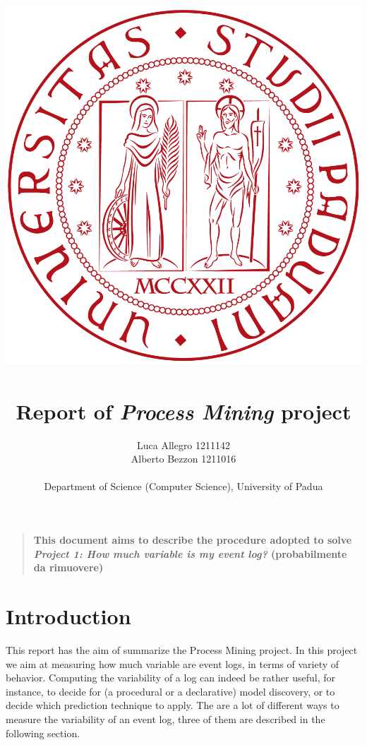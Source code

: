 \documentclass[12pt]{article}
\title{
		\includegraphics[scale=0.20]{logo-unipd}~ 
		\\[2cm]
		Report of {\it Process Mining\/} project
	}
\author
{Luca Allegro 1211142 \\ Alberto Bezzon 1211016\\
\\
Department of Science (Computer Science), University of Padua
}
\date{}
\newenvironment{sciabstract}{%
\begin{quote} \bf}
{\end{quote}}
\begin{document}
 


\baselineskip18pt


\maketitle 




\begin{sciabstract}
  This document aims to describe the procedure adopted to solve \textit{Project 1: How much variable is my event log?}
  (probabilmente da rimuovere)
\end{sciabstract}




\newpage
\section*{Introduction}

This report has the aim of summarize the Process Mining project. In this project we aim at measuring how much variable are event logs, in terms of variety of behavior. Computing the variability of a log can indeed be rather useful, for instance, to decide for (a procedural or a declarative) model discovery, or to decide which prediction technique to apply. The are a lot of different ways to measure the variability of an event log, three of them are described in the following section.
\end{document}
